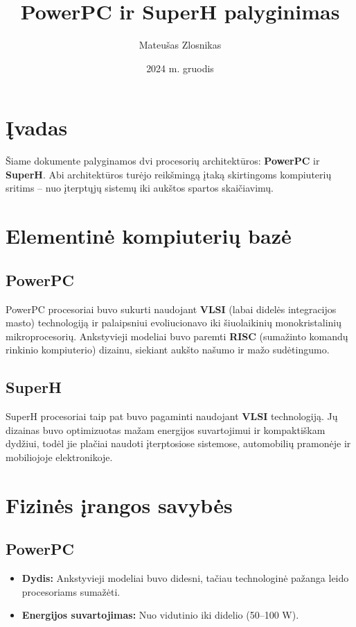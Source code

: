 \documentclass{article}
\title{PowerPC ir SuperH palyginimas}
\author{Mateušas Zlosnikas}
\date{2024 m. gruodis}
\begin{document}
\maketitle

\tableofcontents

\section{Įvadas}
Šiame dokumente palyginamos dvi procesorių architektūros: \textbf{PowerPC} ir \textbf{SuperH}. Abi architektūros turėjo reikšmingą įtaką skirtingoms kompiuterių sritims – nuo įterptųjų sistemų iki aukštos spartos skaičiavimų.

\section{Elementinė kompiuterių bazė}
\subsection{PowerPC}
PowerPC procesoriai buvo sukurti naudojant \textbf{VLSI} (labai didelės integracijos masto) technologiją ir palaipsniui evoliucionavo iki šiuolaikinių monokristalinių mikroprocesorių. Ankstyvieji modeliai buvo paremti \textbf{RISC} (sumažinto komandų rinkinio kompiuterio) dizainu, siekiant aukšto našumo ir mažo sudėtingumo.

\subsection{SuperH}
SuperH procesoriai taip pat buvo pagaminti naudojant \textbf{VLSI} technologiją. Jų dizainas buvo optimizuotas mažam energijos suvartojimui ir kompaktiškam dydžiui, todėl jie plačiai naudoti įterptosiose sistemose, automobilių pramonėje ir mobiliojoje elektronikoje.

\section{Fizinės įrangos savybės}
\subsection{PowerPC}
\begin{itemize}
    \item \textbf{Dydis:} Ankstyvieji modeliai buvo didesni, tačiau technologinė pažanga leido procesoriams sumažėti.
    \item \textbf{Energijos suvartojimas:} Nuo vidutinio iki didelio (50–100 W).
\end{itemize}
\end{document}
